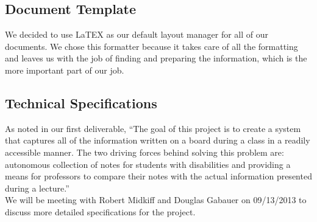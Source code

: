 \documentclass[]{article}
\begin{document}
		\subsection{Document Template}
			We decided to use LaTEX as our default layout manager for all of our documents. We chose this formatter because it takes care of all the formatting and leaves us with the job of finding and preparing the information, which is the more important part of our job. 

		\subsection{Technical Specifications}
			As noted in our first deliverable, “The goal of this project is to create a system that captures all of the information written on a board during a class in a readily accessible manner. The two driving forces behind solving this problem are: autonomous collection of notes for students with disabilities and providing a means for professors to compare their notes with the actual information presented during a lecture.” \\

			We will be meeting with Robert Midkiff and Douglas Gabauer on 09/13/2013 to discuss more detailed specifications for the project.\\

		
	
	
\end{document}
